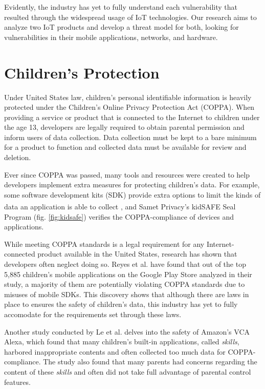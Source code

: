 \documentclass[12pt]{ucthesis}
\begin{document}
Evidently, the industry has yet to fully understand each vulnerability that resulted through the widespread usage of IoT technologies. Our research aims to analyze two IoT products and develop a threat model for both, looking for vulnerabilities in their mobile applications, networks, and hardware.

\section{Children's Protection}
Under United States law, children's personal identifiable information is heavily protected under the Children's Online Privacy Protection Act (COPPA). When providing a service or product that is connected to the Internet to children under the age 13, developers are legally required to obtain parental permission and inform users of data collection. Data collection must be kept to a bare minimum for a product to function and collected data must be available for review and deletion.

Ever since COPPA was passed, many tools and resources were created to help developers implement extra measures for protecting children's data. For example, some software development kits (SDK) provide extra options to limit the kinds of data an application is able to collect \cite{reyes:coppa}, and Samet Privacy's kidSAFE\textsuperscript{\textregistered} Seal Program (fig. \ref{fig:kidsafe}) verifies the COPPA-compliance of devices and applications.

While meeting COPPA standards is a legal requirement for any Internet-connected product available in the United States, research has shown that developers often neglect doing so. Reyes et al. \cite{reyes:coppa} have found that out of the top 5,885 children's mobile applications on the Google Play Store analyzed in their study, a majority of them are potentially violating COPPA standards due to misuses of mobile SDKs. This discovery shows that although there are laws in place to ensures the safety of children's data, this industry has yet to fully accomodate for the requirements set through these laws. 

Another study conducted by Le et al. \cite{le:skillbot} delves into the safety of Amazon's VCA Alexa, which found that many children's built-in applications, called \textit{skills}, harbored inappropriate contents and often collected too much data for COPPA-compliance. The study also found that many parents had concerns regarding the content of these \textit{skills} and often did not take full advantage of parental control features.
\end{document}
